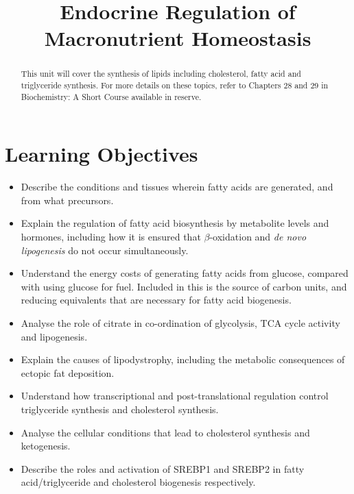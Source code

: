\documentclass{tufte-handout}
\title{Endocrine Regulation of Macronutrient Homeostasis}
\author{}
\date{}  %
\begin{document}
\maketitle%

\begin{abstract}
\noindent This unit will cover the synthesis of lipids including cholesterol, fatty acid and triglyceride synthesis.  For more details on these topics, refer to Chapters 28 and 29 in Biochemistry: A Short Course available in reserve\cite{Berg2015}.
\end{abstract}

\tableofcontents

\pagebreak
\section{Learning Objectives}

\begin{itemize}
\item Describe the conditions and tissues wherein fatty acids are generated, and from what precursors.
\item Explain the regulation of fatty acid biosynthesis by metabolite levels and hormones, including how it is ensured that $\beta$-oxidation and \textit{de novo lipogenesis} do not occur simultaneously.
\item Understand the energy costs of generating fatty acids from glucose, compared with using glucose for fuel.  Included in this is the source of carbon units, and reducing equivalents that are necessary for fatty acid biogenesis.
\item Analyse the role of citrate in co-ordination of glycolysis, TCA cycle activity and lipogenesis.
\item Explain the causes of lipodystrophy, including the metabolic consequences of ectopic fat deposition.
\item Understand how transcriptional and post-translational regulation control triglyceride synthesis and cholesterol synthesis.
\item Analyse the cellular conditions that lead to cholesterol synthesis and ketogenesis.
\item Describe the roles and activation of SREBP1 and SREBP2 in fatty acid/triglyceride and cholesterol biogenesis respectively.
\end{itemize}
\end{document}
